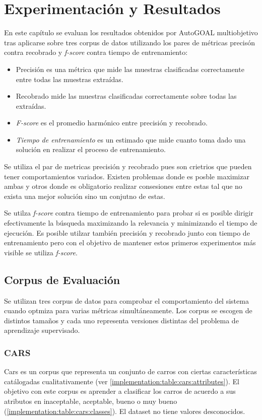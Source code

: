 \chapter{Experimentaci\'on y Resultados}\label{chapter:experiments}
En este cap\'itulo se evaluan los resultados obtenidos por AutoGOAL multiobjetivo tras aplicarse sobre tres corpus de datos utilizando los pares de m\'etricas precis\'on contra recobrado y \textit{f-score} contra tiempo de entrenamiento:
\begin{itemize}
    \item Precisi\'on es una m\'etrica que mide las muestras clasificadas correctamente entre todas las muestras extra\'idas.
    \item Recobrado mide las muestras clasificadas correctamente sobre todas las extra\'idas.
    \item \textit{F-score} es el promedio harm\'onico entre precisi\'on y recobrado.
    \item \textit{Tiempo de entrenamiento} es un estimado que mide cuanto toma dado una soluci\'on en realizar el proceso de entrenamiento.
\end{itemize}

Se utiliza el par de metricas precisi\'on y recobrado pues son crietrios que pueden tener comportamientos variados. Existen problemas donde es posble maximizar ambas y otros donde es obligatorio realizar consesiones entre estas tal que no exista una mejor soluci\'on sino un conjutno de estas.

Se utilza \textit{f-score} contra tiempo de entrenamiento para probar si es posible dirigir efectivamente  la b\'usqueda maximizando la relevancia y minimizando el tiempo de ejecuci\'on. Es posible utilzar tambi\'en precisi\'on y recobrado junto con tiempo de entrenamiento pero con el objetivo de mantener estos primeros experimentos m\'as visible se utiliza \textit{f-score}.

\section{Corpus de Evaluaci\'on}
Se utilizan tres corpus de datos para comprobar el comportamiento del sistema cuando optmiza para varias m\'etricas simult\'aneamente. Los corpus se escogen de distintos tamaños y cada uno representa versiones distintas del problema de aprendizaje supervisado.

\subsection{CARS}
Cars es un corpus que representa un conjunto de carros con ciertas caracter\'isticas cat\'alogadas cualitativamente (ver \ref{implementation:table:cars:attributes}). El objetivo con este corpus es aprender a clasificar los carros de  acuerdo a sus atributos  en inaceptable, aceptable, bueno o muy bueno (\ref{implementation:table:cars:classes}). El dataset no tiene valores desconocidos.

